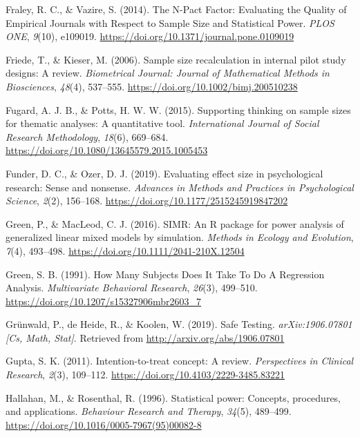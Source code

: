 \documentclass[
  english,
  ,jou, a4paper,floatsintext]{apa6}
\newlength{\cslhangindent}
\newenvironment{cslreferences}%
  {\setlength{\parindent}{0pt}%
  \everypar{\setlength{\hangindent}{\cslhangindent}}\ignorespaces}%
  {\par}
\begin{document}
\begin{cslreferences}
\leavevmode\hypertarget{ref-fraley_n-pact_2014}{}%
Fraley, R. C., \& Vazire, S. (2014). The N-Pact Factor: Evaluating the Quality of Empirical Journals with Respect to Sample Size and Statistical Power. \emph{PLOS ONE}, \emph{9}(10), e109019. \url{https://doi.org/10.1371/journal.pone.0109019}

\leavevmode\hypertarget{ref-friede_sample_2006}{}%
Friede, T., \& Kieser, M. (2006). Sample size recalculation in internal pilot study designs: A review. \emph{Biometrical Journal: Journal of Mathematical Methods in Biosciences}, \emph{48}(4), 537--555. \url{https://doi.org/10.1002/bimj.200510238}

\leavevmode\hypertarget{ref-fugard_supporting_2015}{}%
Fugard, A. J. B., \& Potts, H. W. W. (2015). Supporting thinking on sample sizes for thematic analyses: A quantitative tool. \emph{International Journal of Social Research Methodology}, \emph{18}(6), 669--684. \url{https://doi.org/10.1080/13645579.2015.1005453}

\leavevmode\hypertarget{ref-funder_evaluating_2019}{}%
Funder, D. C., \& Ozer, D. J. (2019). Evaluating effect size in psychological research: Sense and nonsense. \emph{Advances in Methods and Practices in Psychological Science}, \emph{2}(2), 156--168. \url{https://doi.org/10.1177/2515245919847202}

\leavevmode\hypertarget{ref-green_simr_2016}{}%
Green, P., \& MacLeod, C. J. (2016). SIMR: An R package for power analysis of generalized linear mixed models by simulation. \emph{Methods in Ecology and Evolution}, \emph{7}(4), 493--498. \url{https://doi.org/10.1111/2041-210X.12504}

\leavevmode\hypertarget{ref-green_how_1991}{}%
Green, S. B. (1991). How Many Subjects Does It Take To Do A Regression Analysis. \emph{Multivariate Behavioral Research}, \emph{26}(3), 499--510. \url{https://doi.org/10.1207/s15327906mbr2603_7}

\leavevmode\hypertarget{ref-grunwald_safe_2019}{}%
Grünwald, P., de Heide, R., \& Koolen, W. (2019). Safe Testing. \emph{arXiv:1906.07801 {[}Cs, Math, Stat{]}}. Retrieved from \url{http://arxiv.org/abs/1906.07801}

\leavevmode\hypertarget{ref-gupta_intention_2011}{}%
Gupta, S. K. (2011). Intention-to-treat concept: A review. \emph{Perspectives in Clinical Research}, \emph{2}(3), 109--112. \url{https://doi.org/10.4103/2229-3485.83221}

\leavevmode\hypertarget{ref-hallahan_statistical_1996}{}%
Hallahan, M., \& Rosenthal, R. (1996). Statistical power: Concepts, procedures, and applications. \emph{Behaviour Research and Therapy}, \emph{34}(5), 489--499. \url{https://doi.org/10.1016/0005-7967(95)00082-8}


\end{cslreferences}
\end{document}
